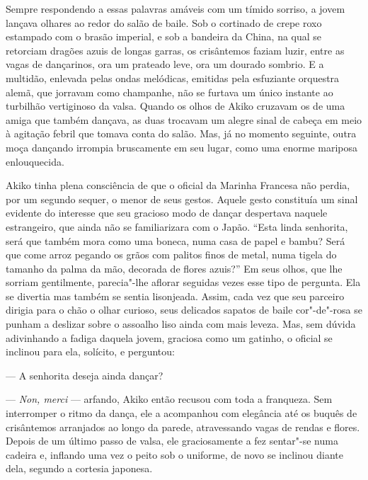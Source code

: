 Sempre respondendo a essas palavras amáveis com um tímido sorriso, a
jovem lançava olhares ao redor do salão de baile. Sob o cortinado de
crepe roxo estampado com o brasão imperial, e sob a bandeira da China,
na qual se retorciam dragões azuis de longas garras, os crisântemos
faziam luzir, entre as vagas de dançarinos, ora um prateado leve, ora
um dourado sombrio. E a multidão, enlevada pelas ondas melódicas,
emitidas pela esfuziante orquestra alemã, que jorravam como champanhe,
não se furtava um único instante ao turbilhão vertiginoso da valsa.
Quando os olhos de Akiko cruzavam os de uma amiga que também dançava,
as duas trocavam um alegre sinal de cabeça em meio à agitação febril
que tomava conta do salão. Mas, já no momento seguinte, outra moça
dançando irrompia bruscamente em seu lugar, como uma enorme mariposa
enlouquecida.

Akiko tinha plena consciência de que o oficial da Marinha Francesa não	%
perdia, por um segundo sequer, o menor de seus gestos. Aquele gesto
constituía um sinal evidente do interesse que seu gracioso modo de
dançar despertava naquele estrangeiro, que ainda não se familiarizara
com o Japão. ``Esta linda senhorita, será que também mora como uma
boneca, numa casa de papel e bambu? Será que come arroz pegando os
grãos com palitos finos de metal, numa tigela do tamanho da palma da
mão, decorada de flores azuis?'' Em seus olhos, que lhe sorriam
gentilmente, parecia"-lhe aflorar seguidas vezes esse tipo de pergunta.
Ela se divertia mas também se sentia lisonjeada. Assim, cada vez que
seu parceiro dirigia para o chão o olhar curioso, seus delicados
sapatos de baile cor"-de"-rosa se punham a deslizar sobre o assoalho liso
ainda com mais leveza. Mas, sem dúvida adivinhando a fadiga daquela
jovem, graciosa como um gatinho, o oficial se inclinou para ela,
solícito, e perguntou:

--- A senhorita deseja ainda dançar?

--- \textit{Non, merci} --- arfando, Akiko então recusou com toda a
franqueza. Sem interromper o ritmo da dança, ele a acompanhou com
elegância até os buquês de crisântemos arranjados ao longo da parede,
atravessando vagas de rendas e flores. Depois de um último passo de
valsa, ele graciosamente a fez sentar"-se numa cadeira e, inflando uma
vez o peito sob o uniforme, de novo se inclinou diante dela, segundo a
cortesia japonesa.

